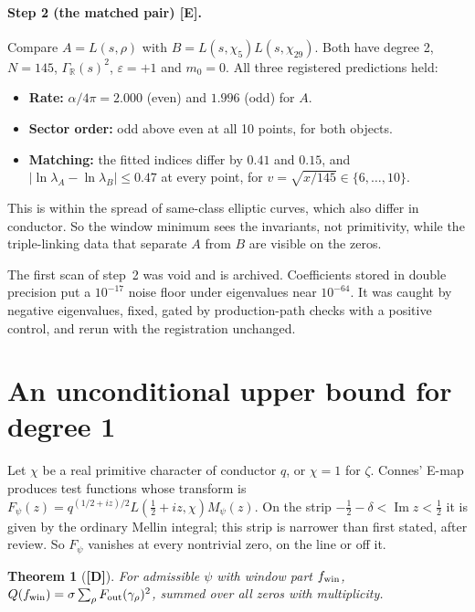 \documentclass[11pt]{article}
\newtheorem{theorem}{Theorem}
\theoremstyle{remark}
\newcommand{\tagD}{\textbf{[D]}}
\newcommand{\tagE}{\textbf{[E]}}
\begin{document}
\paragraph{Step 2 (the matched pair) \tagE.} Compare $A=L(s,\rho)$ with $B=L(s,\chi_5)L(s,\chi_{29})$. Both have degree 2, $N=145$, $\Gamma_{\mathbb R}(s)^2$, $\varepsilon=+1$ and $m_0=0$. All three registered predictions held:
\begin{itemize}
\item \textbf{Rate:} $\alpha/4\pi=2.000$ (even) and $1.996$ (odd) for $A$.
\item \textbf{Sector order:} odd above even at all 10 points, for both objects.
\item \textbf{Matching:} the fitted indices differ by $0.41$ and $0.15$, and $|\ln\lambda_A-\ln\lambda_B|\le0.47$ at every point, for $v=\sqrt{x/145}\in\{6,\dots,10\}$.
\end{itemize}
This is within the spread of same-class elliptic curves, which also differ in conductor. So the window minimum sees the invariants, not primitivity, while the triple-linking data that separate $A$ from $B$ are visible on the zeros.

The first scan of step~2 was void and is archived. Coefficients stored in double precision put a $10^{-17}$ noise floor under eigenvalues near $10^{-64}$. It was caught by negative eigenvalues, fixed, gated by production-path checks with a positive control, and rerun with the registration unchanged.

\section{An unconditional upper bound for degree 1}\label{sec:r2}

Let $\chi$ be a real primitive character of conductor $q$, or $\chi=1$ for $\zeta$. Connes' E-map produces test functions whose transform is $F_\psi(z)=q^{(1/2+iz)/2}L(\tfrac12+iz,\chi)M_\psi(z)$. On the strip $-\tfrac12-\delta<\operatorname{Im}z<\tfrac12$ it is given by the ordinary Mellin integral; this strip is narrower than first stated, after review. So $F_\psi$ vanishes at every nontrivial zero, on the line or off it.

\begin{theorem}[\tagD]\label{thm:emap}
For admissible $\psi$ with window part $f_{\rm win}$, $Q(f_{\rm win})=\sigma\sum_\rho F_{\rm out}(\gamma_\rho)^2$, summed over all zeros with multiplicity.
\end{theorem}
\end{document}

